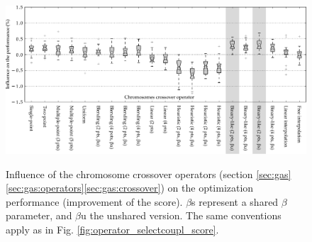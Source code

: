 \documentclass{ametsoc}
\begin{document}
\begin{figure}[t]
	\begin{center}
		\noindent\includegraphics[width=39pc,angle=0]{fig06.pdf}\\
	\end{center}
	\caption{Influence of the chromosome crossover operators (section \ref{sec:gas}\ref{sec:gas:operators}\ref{sec:gas:crossover}) on the optimization performance (improvement of the score).  $\beta$s represent a shared $\beta$ parameter, and $\beta$u the unshared version. The same conventions apply as in Fig. \ref{fig:operator_selectcoupl_score}.}
	\label{fig:operator_crossover_score}
\end{figure}
\end{document}
